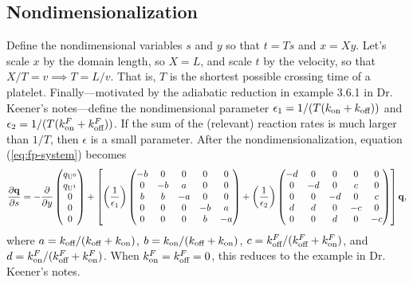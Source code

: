 \documentclass{article}
\newcommand{\tn}{\textnormal}
\newcommand{\Pder}[2]{\frac{\partial #1}{\partial #2}}
\begin{document}
\subsection{Nondimensionalization}
\label{sec:nondim}

Define the nondimensional variables $s$ and $y$ so that $t = Ts$ and
$x = Xy$. Let's scale $x$ by the domain length, so $X = L$, and scale
$t$ by the velocity, so that $X/T = v \implies T = L/v$. That is, $T$
is the shortest possible crossing time of a
platelet. Finally---motivated by the adiabatic reduction in example
3.6.1 in Dr. Keener's notes---define the nondimensional parameter
$\epsilon_1 = 1/(T(k_\tn{on} + k_\tn{off}))$ and
$\epsilon_2 = 1/(T(k_\tn{on}^F + k_\tn{off}^F))$. If the sum of the
(relevant) reaction rates is much larger than $1/T$, then $\epsilon$
is a small parameter. After the nondimensionalization, equation
(\ref{eq:fp-system}) becomes
\begin{equation}
  \label{eq:nd-system}
  \Pder{\mathbf{q}}{s} = -\Pder{}{y}
  \begin{pmatrix}
    q_{\tn{U}^0} \\ q_{\tn{U}^1} \\ 0 \\ 0 \\ 0
  \end{pmatrix}
  + \left[\left(\frac{1}{\epsilon_1}\right) 
  \begin{pmatrix}
    - b & 0 & 0 & 0 & 0 \\
    0 & - b & a & 0 & 0 \\
    b & b & - a & 0 & 0 \\
    0 & 0 & 0 & - b & a \\
    0 & 0 & 0 & b & - a
  \end{pmatrix}
  + \left(\frac{1}{\epsilon_2}\right)
  \begin{pmatrix}
    - d & 0 & 0 & 0 & 0 \\
    0 & - d & 0 & c & 0 \\
    0 & 0 & - d & 0 & c \\
    d & d & 0 & - c & 0 \\
    0 & 0 & d & 0 & - c
  \end{pmatrix}\right]
  \mathbf{q},
\end{equation}
where $a = k_\tn{off}/(k_\tn{off} + k_\tn{on})$,
$b = k_\tn{on}/(k_\tn{off} + k_\tn{on})$,
$c = k_\tn{off}^F/(k_\tn{off}^F + k_\tn{on}^F)$, and
$d = k_\tn{on}^F/(k_\tn{off}^F + k_\tn{on}^F)$. When
$k_\tn{on}^F = k_\tn{off}^F = 0$, this reduces to the example in
Dr. Keener's notes.
\end{document}
